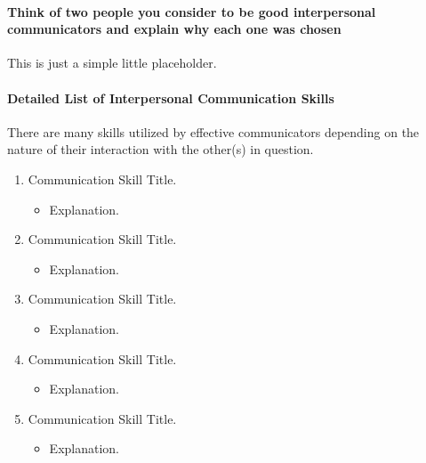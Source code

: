 \documentclass[stu,12pt]{apa7}
\begin{document}
    \paragraph{Think of two people you consider to be good interpersonal
      communicators and explain why each one was chosen}
      This is just a simple little placeholder.

    \paragraph{Detailed List of Interpersonal Communication Skills}
      There are many skills utilized by effective communicators depending on the
        nature of their interaction with the other(s) in question.
      \begin{enumerate}
        \item Communication Skill Title.
          \begin{itemize}
            \item Explanation.
          \end{itemize}
        \item Communication Skill Title.
          \begin{itemize}
            \item Explanation.
          \end{itemize}
        \item Communication Skill Title.
          \begin{itemize}
            \item Explanation.
          \end{itemize}
        \item Communication Skill Title.
          \begin{itemize}
            \item Explanation.
          \end{itemize}
        \item Communication Skill Title.
          \begin{itemize}
            \item Explanation.
          \end{itemize}
      \end{enumerate}


  \nocite{michell_hyde_2012}
  \printbibliography[%
    title={Works Cited}%
  ]
\end{document}
